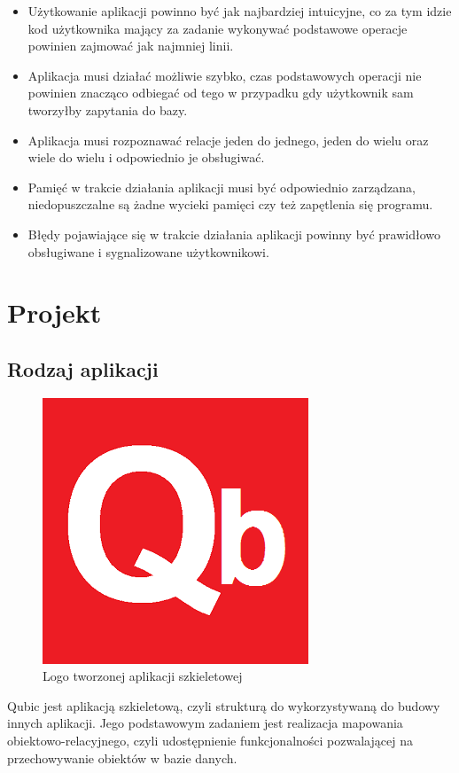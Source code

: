 \documentclass[12pt]{report}
\begin{document}
\begin{itemize}
\item Użytkowanie aplikacji powinno być jak najbardziej intuicyjne, co za tym idzie kod użytkownika mający za zadanie wykonywać podstawowe operacje powinien zajmować
jak najmniej linii.
\item Aplikacja musi działać możliwie szybko, czas podstawowych operacji nie powinien znacząco odbiegać od tego w przypadku gdy użytkownik sam two\-rzyłby zapytania do bazy.
\item Aplikacja musi rozpoznawać relacje jeden do jednego, jeden do wielu oraz wiele do wielu i odpowiednio je obsługiwać.
\item Pamięć w trakcie działania aplikacji musi być odpowiednio zarządzana, niedopuszczalne są żadne wycieki pamięci czy też zapętlenia się programu.
\item Błędy pojawiające się w trakcie działania aplikacji powinny być prawidłowo obsługiwane i sygnalizowane użytkownikowi.
\end{itemize}

\section{Projekt}

\subsection{Rodzaj aplikacji}

\begin{figure}[h]
\centering
\includegraphics[width=.55\textwidth]{resources/qb.png}
\caption{Logo tworzonej aplikacji szkieletowej}
\end{figure}

Qubic jest aplikacją szkieletową, czyli strukturą do wykorzystywaną do budowy innych aplikacji. Jego podstawowym zadaniem jest realizacja mapowania obiektowo-relacyjnego,
czyli udostępnienie funkcjonalności pozwalającej na przechowywanie obiektów w bazie danych.
\end{document}
